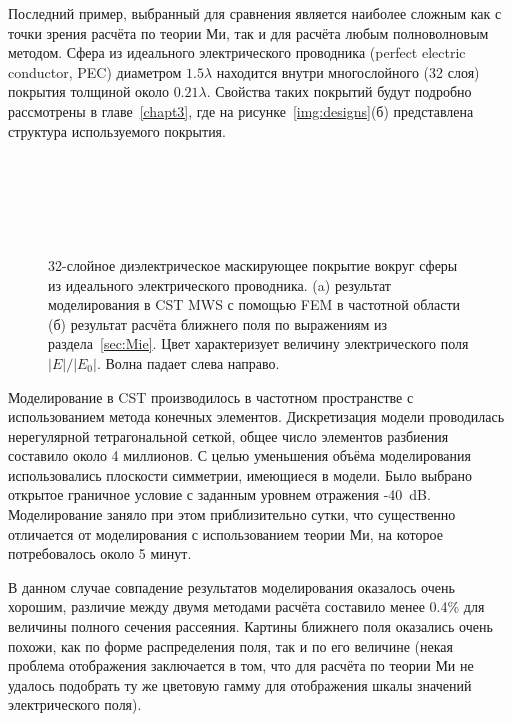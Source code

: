 Последний пример, выбранный для сравнения является наиболее сложным
как с точки зрения расчёта по теории Ми, так и для расчёта любым
полноволновым методом. Сфера из идеального электрического проводника
(perfect electric conductor, PEC) диаметром $1.5\lambda$ находится
внутри многослойного (32 слоя) покрытия толщиной около
$0.21\lambda$. Свойства таких покрытий будут подробно рассмотрены в
главе~\ref{chapt3}, где на рисунке~\ref{img:designs}(б) представлена
структура используемого покрытия. 
\begin{figure}[p] %
  \begin{minipage}[ht]{0.99\linewidth}        
  \end{minipage}\\
  \vfill
  \begin{minipage}[ht]{0.99\linewidth}        
  \end{minipage}\\
  \vfill
  \begin{minipage}[ht]{0.95\linewidth}
  \end{minipage}\\
  \vfill
  \begin{minipage}[ht]{0.99\linewidth}
  \end{minipage}
  \caption{32-слойное диэлектрическое маскирующее покрытие вокруг
    сферы из идеального электрического проводника. (a) результат моделирования в CST
    MWS с помощью FEM  в частотной области (б)
    результат расчёта ближнего поля по выражениям из
    раздела~\ref{sec:Mie}. Цвет характеризует величину электрического
    поля $|E|/|E_0|$. Волна падает слева направо.\label{img:e32layer}}
\end{figure}

Моделирование в CST производилось в частотном пространстве с
использованием метода конечных элементов. Дискретизация модели
проводилась нерегулярной тетрагональной сеткой, общее число элементов
разбиения составило около 4 миллионов.  С целью уменьшения объёма
моделирования использовались плоскости симметрии, имеющиеся в
модели. Было выбрано открытое граничное условие с заданным уровнем
отражения -40~dB. Моделирование заняло при этом приблизительно сутки,
что существенно отличается от моделирования с использованием теории
Ми, на которое потребовалось около 5 минут. 

В данном случае совпадение результатов моделирования оказалось очень
хорошим, различие между двумя методами расчёта составило менее 0.4\% 
для величины полного сечения рассеяния. Картины ближнего поля оказались очень похожи, как по форме распределения поля, так и по его
величине (некая проблема отображения заключается в том, что для
расчёта по теории Ми не удалось подобрать ту же цветовую гамму для
отображения шкалы значений электрического поля). %


